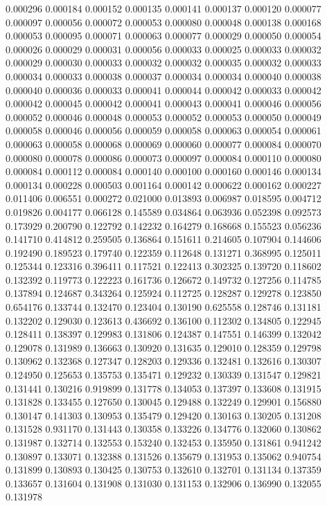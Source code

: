 0.000296
0.000184
0.000152
0.000135
0.000141
0.000137
0.000120
0.000077
0.000097
0.000056
0.000072
0.000053
0.000080
0.000048
0.000138
0.000168
0.000053
0.000095
0.000071
0.000063
0.000077
0.000029
0.000050
0.000054
0.000026
0.000029
0.000031
0.000056
0.000033
0.000025
0.000033
0.000032
0.000029
0.000030
0.000033
0.000032
0.000032
0.000035
0.000032
0.000033
0.000034
0.000033
0.000038
0.000037
0.000034
0.000034
0.000040
0.000038
0.000040
0.000036
0.000033
0.000041
0.000044
0.000042
0.000033
0.000042
0.000042
0.000045
0.000042
0.000041
0.000043
0.000041
0.000046
0.000056
0.000052
0.000046
0.000048
0.000053
0.000052
0.000053
0.000050
0.000049
0.000058
0.000046
0.000056
0.000059
0.000058
0.000063
0.000054
0.000061
0.000063
0.000058
0.000068
0.000069
0.000060
0.000077
0.000084
0.000070
0.000080
0.000078
0.000086
0.000073
0.000097
0.000084
0.000110
0.000080
0.000084
0.000112
0.000084
0.000140
0.000100
0.000160
0.000146
0.000134
0.000134
0.000228
0.000503
0.001164
0.000142
0.000622
0.000162
0.000227
0.011406
0.006551
0.000272
0.021000
0.013893
0.006987
0.018595
0.004712
0.019826
0.004177
0.066128
0.145589
0.034864
0.063936
0.052398
0.092573
0.173929
0.200790
0.122792
0.142232
0.164279
0.168668
0.155523
0.056236
0.141710
0.414812
0.259505
0.136864
0.151611
0.214605
0.107904
0.144606
0.192490
0.189523
0.179740
0.122359
0.112648
0.131271
0.368995
0.125011
0.125344
0.123316
0.396411
0.117521
0.122413
0.302325
0.139720
0.118602
0.132392
0.119773
0.122223
0.161736
0.126672
0.149732
0.127256
0.114785
0.137894
0.124687
0.343264
0.125924
0.112725
0.128287
0.129278
0.123850
0.654176
0.133744
0.132470
0.123404
0.130190
0.625558
0.128746
0.131181
0.132202
0.129030
0.123613
0.436692
0.136100
0.112302
0.134805
0.122945
0.128411
0.138397
0.129983
0.131806
0.124387
0.147551
0.146399
0.132042
0.129078
0.131989
0.136663
0.130920
0.131635
0.129010
0.128359
0.129798
0.130962
0.132368
0.127347
0.128203
0.129336
0.132481
0.132616
0.130307
0.124950
0.125653
0.135753
0.135471
0.129232
0.130339
0.131547
0.129821
0.131441
0.130216
0.919899
0.131778
0.134053
0.137397
0.133608
0.131915
0.131828
0.133455
0.127650
0.130045
0.129488
0.132249
0.129901
0.156880
0.130147
0.141303
0.130953
0.135479
0.129420
0.130163
0.130205
0.131208
0.131528
0.931170
0.131443
0.130358
0.133226
0.134776
0.132060
0.130862
0.131987
0.132714
0.132553
0.153240
0.132453
0.135950
0.131861
0.941242
0.130897
0.133071
0.132388
0.131526
0.135679
0.131953
0.135062
0.940754
0.131899
0.130893
0.130425
0.130753
0.132610
0.132701
0.131134
0.137359
0.133657
0.131604
0.131908
0.131030
0.131153
0.132906
0.136990
0.132055
0.131978
